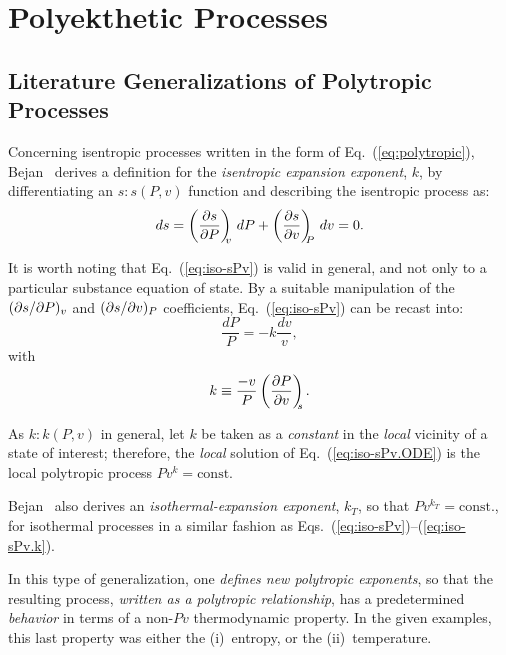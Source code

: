 \section{Polyekthetic Processes}

    \subsection{Literature Generalizations of Polytropic Processes}

    Concerning  isentropic  processes  written  in  the   form   of   Eq.~(\ref{eq:polytropic}),
    Bejan~\cite{2006-BejanA-Wiley} derives  a  definition  for  the  \emph{isentropic  expansion
    exponent}, $k$, by differentiating an $s\!:\!s(P, v)$ function and describing the isentropic
    process as:
    \begin{equation}
        ds = \left(\frac{\partial {{s}}}{\partial {{P}}}\right)_{\!\!\!{v}}\,dP + \left(\frac{\partial {{s}}}{\partial {{v}}}\right)_{\!\!\!{P}}\,dv = 0.
        \label{eq:iso-sPv}
    \end{equation}

    It is worth noting that Eq.~(\ref{eq:iso-sPv}) is valid  in  general,  and  not  only  to  a
    particular substance equation of state. By a suitable manipulation of the $({\partial {{s}}}/{\partial {{P}}})_{{v}}$  and
    $({\partial {{s}}}/{\partial {{v}}})_{{P}}$ coefficients, Eq.~(\ref{eq:iso-sPv}) can be recast into:
    \begin{equation}
        \frac{dP}{P} = -k\frac{dv}{v},
        \label{eq:iso-sPv.ODE}
    \end{equation}
    \noindent with
    \begin{equation}
        k \equiv \frac{-v}{P}\left(\frac{\partial {{P}}}{\partial {{v}}}\right)_{\!\!\!{s}}.
        \label{eq:iso-sPv.k}
    \end{equation}

    As $k\!:\!k(P, v)$ in general, let $k$ be taken as a  \emph{constant}  in  the  \emph{local}
    vicinity   of   a   state   of   interest;   therefore,   the   \emph{local}   solution   of
    Eq.~(\ref{eq:iso-sPv.ODE}) is the local polytropic process $Pv^k = \mbox{const.}$

    Bejan~\cite{2006-BejanA-Wiley} also derives an \emph{isothermal-expansion exponent},  $k_T$,
    so that $Pv^{k_T} = \mbox{const.}$,  for  isothermal  processes  in  a  similar  fashion  as
    Eqs.~(\ref{eq:iso-sPv})--(\ref{eq:iso-sPv.k}).

    In this type of generalization, one \emph{defines new polytropic  exponents},  so  that  the
    resulting  process,  \emph{written  as  a  polytropic  relationship},  has  a  predetermined
    \emph{behavior} in terms of a non-$Pv$ thermodynamic property. In the given  examples,  this
    last property was either the (i)~entropy, or the (ii)~temperature.

